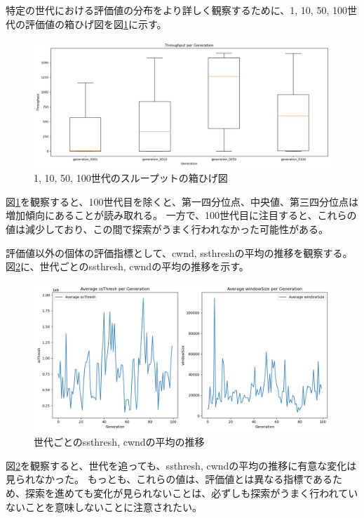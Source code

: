 \documentclass[a4paper,11pt]{jreport}
\newcommand{\figref}[1]{図\ref{#1}}
\begin{document}
特定の世代における評価値の分布をより詳しく観察するために、1, 10, 50, 100世代の評価値の箱ひげ図を\figref{figure:boxplot_throughput}に示す。
\begin{figure}[thbp]
  \setlength\fboxsep{0pt}
  \centering
  \includegraphics[width=0.9\linewidth]{fig/chap05/boxplot_throughput.png}
  \caption{1, 10, 50, 100世代のスループットの箱ひげ図}
  \label{figure:boxplot_throughput}
\end{figure}
\figref{figure:boxplot_throughput}を観察すると、100世代目を除くと、第一四分位点、中央値、第三四分位点は増加傾向にあることが読み取れる。
一方で、100世代目に注目すると、これらの値は減少しており、この間で探索がうまく行われなかった可能性がある。

評価値以外の個体の評価指標として、cwnd, ssthreshの平均の推移を観察する。
\figref{figure:generation_result}に、世代ごとのssthresh, cwndの平均の推移を示す。
\begin{figure}[thbp]
  \setlength\fboxsep{0pt}
  \centering
  \includegraphics[width=1.0\linewidth]{fig/chap05/generation_result.png}
  \caption{世代ごとのssthresh, cwndの平均の推移}
  \label{figure:generation_result}
\end{figure}
\figref{figure:generation_result}を観察すると、世代を追っても、ssthresh, cwndの平均の推移に有意な変化は見られなかった。
もっとも、これらの値は、評価値とは異なる指標であるため、探索を進めても変化が見られないことは、必ずしも探索がうまく行われていないことを意味しないことに注意されたい。
\end{document}
